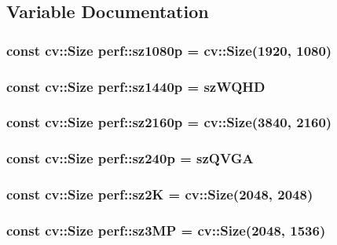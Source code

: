 \subsection{Variable Documentation}
\hypertarget{namespaceperf_ad795e18c34cc44bf1f2d59896d6e9d4d}{
\subsubsection[{sz1080p}]{\setlength{\rightskip}{0pt plus 5cm}const cv\-::\-Size perf\-::sz1080p = cv\-::\-Size(1920, 1080)}}\label{namespaceperf_ad795e18c34cc44bf1f2d59896d6e9d4d}
\hypertarget{namespaceperf_a07606d46d2938bf6d9769ef87c6ddf11}{
\subsubsection[{sz1440p}]{\setlength{\rightskip}{0pt plus 5cm}const cv\-::\-Size perf\-::sz1440p = {\bf sz\-W\-Q\-H\-D}}}\label{namespaceperf_a07606d46d2938bf6d9769ef87c6ddf11}
\hypertarget{namespaceperf_af269eb69cb3ed2ca1ced688349d96118}{
\subsubsection[{sz2160p}]{\setlength{\rightskip}{0pt plus 5cm}const cv\-::\-Size perf\-::sz2160p = cv\-::\-Size(3840, 2160)}}\label{namespaceperf_af269eb69cb3ed2ca1ced688349d96118}
\hypertarget{namespaceperf_a92903038b656ae2b6620911dd2097efd}{
\subsubsection[{sz240p}]{\setlength{\rightskip}{0pt plus 5cm}const cv\-::\-Size perf\-::sz240p = {\bf sz\-Q\-V\-G\-A}}}\label{namespaceperf_a92903038b656ae2b6620911dd2097efd}
\hypertarget{namespaceperf_ae7f6275505429ec52cb19523c5db333a}{
\subsubsection[{sz2\-K}]{\setlength{\rightskip}{0pt plus 5cm}const cv\-::\-Size perf\-::sz2\-K = cv\-::\-Size(2048, 2048)}}\label{namespaceperf_ae7f6275505429ec52cb19523c5db333a}
\hypertarget{namespaceperf_ae3bee08aa583b875fcbc11a757da3ef3}{
\subsubsection[{sz3\-M\-P}]{\setlength{\rightskip}{0pt plus 5cm}const cv\-::\-Size perf\-::sz3\-M\-P = cv\-::\-Size(2048, 1536)}}\label{namespaceperf_ae3bee08aa583b875fcbc11a757da3ef3}
